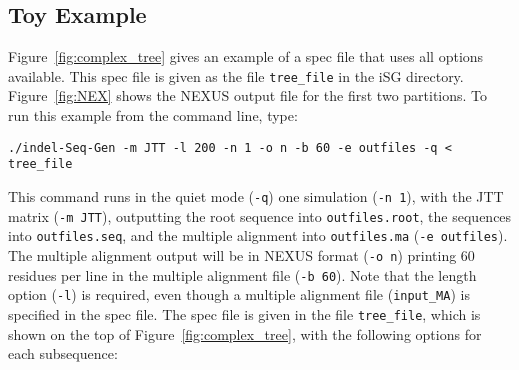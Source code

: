 \documentclass[10pt]{article}
\begin{document}
\subsection{Toy Example}

Figure~\ref{fig:complex_tree} gives an example of a spec file that uses all options available. This spec file is given as the file {\tt tree\_file} in the iSG directory.
Figure~\ref{fig:NEX} shows the NEXUS output file for the first two partitions.
To run this example from the command line, type:

\begin{verbatim}
./indel-Seq-Gen -m JTT -l 200 -n 1 -o n -b 60 -e outfiles -q < tree_file
\end{verbatim}

This command runs in the quiet mode ({\tt -q}) one simulation ({\tt -n 1}), with the JTT
matrix ({\tt -m JTT}), outputting the root sequence into {\tt outfiles.root}, the sequences into {\tt outfiles.seq}, and the multiple alignment into {\tt outfiles.ma} ({\tt -e outfiles}). The multiple alignment output will be in NEXUS format ({\tt -o n}) printing 60 residues per line in the multiple alignment file ({\tt -b 60}).  Note that the length option ({\tt -l})  is required, even though a multiple alignment file ({\tt input\_MA}) is specified in the spec file.  The spec file is given in the file {\tt tree\_file}, which is shown on the top of Figure~\ref{fig:complex_tree}, with the following options for each subsequence:
\end{document}
